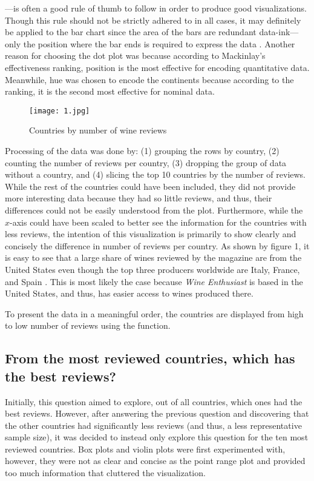 \noindent ---is often a good rule of thumb to follow in order to produce good visualizations. Though this rule should not be strictly adhered to in all cases, it may definitely be applied to the bar chart since the area of the bars are redundant data-ink---only the position where the bar ends is required to express the data \cite{Tufte}. Another reason for choosing the dot plot was because according to Mackinlay's effectiveness ranking, position is the most effective for encoding quantitative data. Meanwhile, hue was chosen to encode the continents because according to the ranking, it is the second most effective for nominal data.

\begin{figure}[h]
  \texttt{[image: 1.jpg]}  
  \caption{Countries by number of wine reviews}
\end{figure}

Processing of the data was done by: (1) grouping the rows by country, (2) counting the number of reviews per country, (3) dropping the group of data without a country, and (4) slicing the top 10 countries by the number of reviews. While the rest of the countries could have been included, they did not provide more interesting data because they had so little reviews, and thus, their differences could not be easily understood from the plot. Furthermore, while the $x$-axis could have been scaled to better see the information for the countries with less reviews, the intention of this visualization is primarily to show clearly and concisely the difference in number of reviews per country. As shown by figure 1, it is easy to see that a large share of wines reviewed by the magazine are from the United States even though the top three producers worldwide are Italy, France, and Spain \cite{Statista}. This is most likely the case because \emph{Wine Enthusiast} is based in the United States, and thus, has easier access to wines produced there.



To present the data in a meaningful order, the countries are displayed from high to low number of reviews using the  function.

\subsection{From the most reviewed countries, which has the best reviews?}
Initially, this question aimed to explore, out of all countries, which ones had the best reviews. However, after answering the previous question and discovering that the other countries had significantly less reviews (and thus, a less representative sample size), it was decided to instead only explore this question for the ten most reviewed countries. Box plots and violin plots were first experimented with, however, they were not as clear and concise as the point range plot and provided too much information that cluttered the visualization. 

